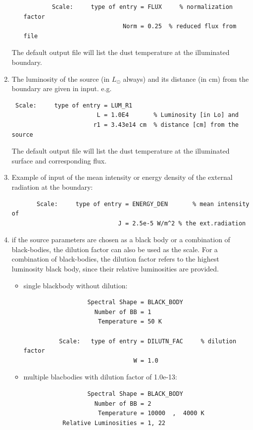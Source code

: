 \documentclass[11pt]{article}
\begin{document}
\begin{enumerate}
\begin{itemize}
\begin{verbatim}
        Scale:     type of entry = FLUX     % normalization factor
                            Norm = 0.25  % reduced flux from file
\end{verbatim}
\end{itemize}
The default output file will list the dust temperature at the illuminated
boundary.
%
\item The luminosity of the source (in $L_\odot$ always) and its distance
    (in cm) from the boundary are given in input. e.g.
\begin{verbatim}
 Scale:     type of entry = LUM_R1
                        L = 1.0E4       % Luminosity [in Lo] and
                       r1 = 3.43e14 cm  % distance [cm] from the source
\end{verbatim}
%
The default output file will list the dust temperature at the illuminated
surface and corresponding flux.
%
\item Example of input of the mean intensity or energy density of the
    external radiation at the boundary:
\begin{verbatim}
       Scale:     type of entry = ENERGY_DEN       % mean intensity of
                              J = 2.5e-5 W/m^2 % the ext.radiation
\end{verbatim}
%
\item if the source parameters are chosen as a black body or a combination
    of black-bodies, the dilution factor can also be used as the scale. For
    a combination of black-bodies, the dilution factor refers to the
    highest luminosity black body, since their relative luminosities are
    provided.
\begin{itemize}
\item single blackbody without dilution:
\begin{verbatim}
                  Spectral Shape = BLACK_BODY
                    Number of BB = 1
                     Temperature = 50 K

          Scale:   type of entry = DILUTN_FAC     % dilution factor
                               W = 1.0
\end{verbatim}
%
\item multiple blacbodies with dilution factor of 1.0e-13:
\begin{verbatim}
                  Spectral Shape = BLACK_BODY
                    Number of BB = 2
                     Temperature = 10000  ,  4000 K
           Relative Luminosities = 1, 22


\end{verbatim}
\end{itemize}
\end{enumerate}
\end{document}
